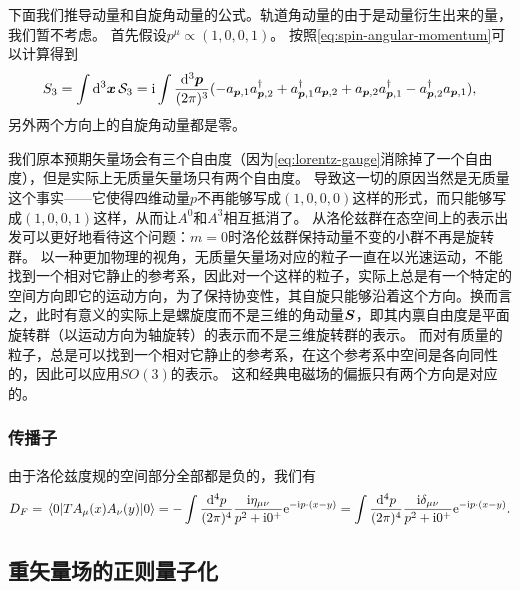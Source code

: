 \documentclass[hyperref, UTF8, a4paper]{ctexart}
\newcommand*{\ii}{\mathrm{i}}
\newcommand*{\ee}{\mathrm{e}}
\begin{document}
下面我们推导动量和自旋角动量的公式。轨道角动量的由于是动量衍生出来的量，我们暂不考虑。
首先假设$p^\mu \propto (1, 0, 0, 1)$。
按照\eqref{eq:spin-angular-momentum}可以计算得到
\[
    {S}_3 = \int \dd[3]{\vb*{x}} \mathcal{S}_3 = \ii \int \frac{\dd[3]{\vb*{p}}}{(2\pi)^3} (- {a}_{\vb*{p},1} {a}^\dagger_{\vb*{p}, 2} + {a}^\dagger_{\vb*{p}, 1} {a}_{\vb*{p}, 2} + {a}_{\vb*{p}, 2} {a}_{\vb*{p}, 1}^\dagger - {a}_{\vb*{p}, 2}^\dagger {a}_{\vb*{p}, 1} ) ,
\]
另外两个方向上的自旋角动量都是零。

我们原本预期矢量场会有三个自由度（因为\eqref{eq:lorentz-gauge}消除掉了一个自由度），但是实际上无质量矢量场只有两个自由度。
导致这一切的原因当然是无质量这个事实——它使得四维动量$p$不再能够写成$(1, 0, 0, 0)$这样的形式，而只能够写成$(1,0,0,1)$这样，从而让$A^0$和$A^3$相互抵消了。
从洛伦兹群在态空间上的表示出发可以更好地看待这个问题：$m=0$时洛伦兹群保持动量不变的小群不再是旋转群。
以一种更加物理的视角，无质量矢量场对应的粒子一直在以光速运动，不能找到一个相对它静止的参考系，因此对一个这样的粒子，实际上总是有一个特定的空间方向即它的运动方向，为了保持协变性，其自旋只能够沿着这个方向。换而言之，此时有意义的实际上是螺旋度而不是三维的角动量${\vb*{S}}$，即其内禀自由度是平面旋转群（以运动方向为轴旋转）的表示而不是三维旋转群的表示。
而对有质量的粒子，总是可以找到一个相对它静止的参考系，在这个参考系中空间是各向同性的，因此可以应用$SO(3)$的表示。
这和经典电磁场的偏振只有两个方向是对应的。



\subsubsection{传播子}

由于洛伦兹度规的空间部分全部都是负的，我们有
\begin{equation}
    D_F = \mel*{0}{T A_{\mu}(x) A_{\nu}(y)}{0} = - \int \frac{\dd[4]{p}}{(2\pi)^4} \frac{\ii \eta_{\mu \nu}}{p^2 + \ii 0^+} \ee^{- \ii p \cdot (x - y)} = \int \frac{\dd[4]{p}}{(2\pi)^4} \frac{\ii \delta_{\mu \nu}}{p^2 + \ii 0^+} \ee^{- \ii p \cdot (x - y)}.
\end{equation}

\subsection{重矢量场的正则量子化}
\end{document}
